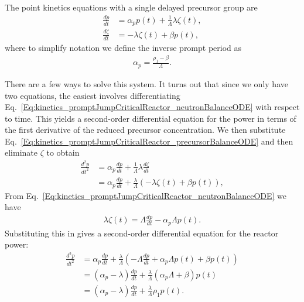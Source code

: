 The point kinetics equations with a single delayed precursor group are
\begin{subequations}
\begin{align}
  \frac{dp}{dt} 		&= \alpha_p p(t) + \frac{1}{\Lambda} \lambda \zeta(t), \label{Eq:kinetics_promptJumpCriticalReactor_neutronBalanceODE} \\
  \frac{d\zeta}{dt} 	&= -\lambda \zeta(t) + \beta p(t), \label{Eq:kinetics_promptJumpCriticalReactor_precursorBalanceODE}
\end{align}
\end{subequations}
where to simplify notation we define the inverse prompt period as
\begin{align}
  \alpha_p = \frac{ \rho_1 - \beta }{ \Lambda } . \nonumber
\end{align}

There are a few ways to solve this system. It turns out that since we only have two equations, the easiest involves differentiating Eq.~\eqref{Eq:kinetics_promptJumpCriticalReactor_neutronBalanceODE} with respect to time. This yields a second-order differential equation for the power in terms of the first derivative of the reduced precursor concentration. We then substitute Eq.~\eqref{Eq:kinetics_promptJumpCriticalReactor_precursorBalanceODE} and then eliminate $\zeta$ to obtain
\begin{align}
  \frac{d^2 p}{dt^2} 
  &= \alpha_p \frac{dp}{dt} + \frac{1}{\Lambda} \lambda \frac{d\zeta}{dt} \nonumber \\
  &= \alpha_p \frac{dp}{dt} + \frac{\lambda}{\Lambda} \left( -\lambda \zeta(t) + \beta p(t) \right) ,
\end{align}
From Eq.~\eqref{Eq:kinetics_promptJumpCriticalReactor_neutronBalanceODE} we have
\begin{align}
  \lambda \zeta(t) = \Lambda \frac{dp}{dt} - \alpha_p \Lambda p(t) . \nonumber
\end{align}
Substituting this in gives a second-order differential equation for the reactor power:
\begin{align}
  \frac{d^2 p}{dt^2} 
  &= \alpha_p \frac{dp}{dt} + \frac{\lambda}{\Lambda}  \left( -\Lambda \frac{dp}{dt} + \alpha_p \Lambda p(t) + \beta p(t) \right)  \nonumber \\
  &= ( \alpha_p - \lambda ) \frac{dp}{dt} +  \frac{\lambda}{\Lambda} ( \alpha_p \Lambda + \beta ) p(t) \nonumber \\
  &= ( \alpha_p - \lambda ) \frac{dp}{dt} +  \frac{\lambda}{\Lambda} \rho_1 p(t) . \nonumber
\end{align}

